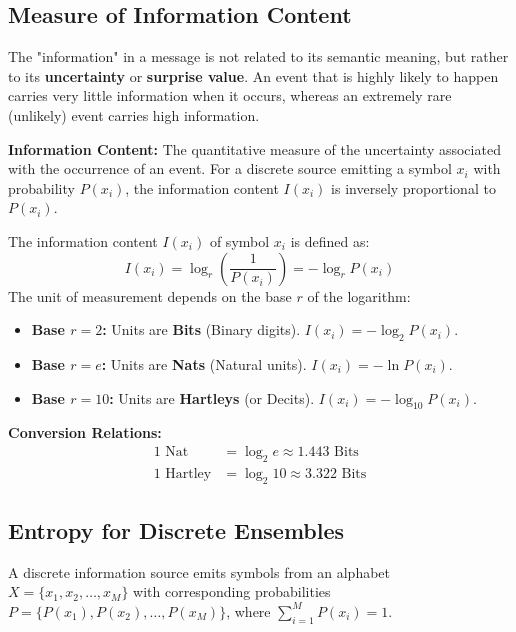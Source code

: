 \documentclass[12pt,a4paper]{article}
\begin{document}
\subsection{Measure of Information Content}
The "information" in a message is not related to its semantic meaning, but rather to its \textbf{uncertainty} or \textbf{surprise value}. An event that is highly likely to happen carries very little information when it occurs, whereas an extremely rare (unlikely) event carries high information.

\begin{tcolorbox}[defbox]
\textbf{Information Content:} The quantitative measure of the uncertainty associated with the occurrence of an event. For a discrete source emitting a symbol $x_i$ with probability $P(x_i)$, the information content $I(x_i)$ is inversely proportional to $P(x_i)$.
\end{tcolorbox}

\begin{tcolorbox}[formulabox, title={\textbf{Information Measurement Formula}}]
The information content $I(x_i)$ of symbol $x_i$ is defined as:
\begin{equation}
  I(x_i) = \log_r \left( \frac{1}{P(x_i)} \right) = -\log_r P(x_i)
\end{equation}
The unit of measurement depends on the base $r$ of the logarithm:
\begin{itemize}[leftmargin=1.5em, itemsep=2pt, topsep=2pt]
  \item[] \textbf{Base $r = 2$:} Units are \textbf{Bits} (Binary digits). $I(x_i) = -\log_2 P(x_i)$.
  \item[] \textbf{Base $r = e$:} Units are \textbf{Nats} (Natural units). $I(x_i) = -\ln P(x_i)$.
  \item[] \textbf{Base $r = 10$:} Units are \textbf{Hartleys} (or Decits). $I(x_i) = -\log_{10} P(x_i)$.
\end{itemize}
\textbf{Conversion Relations:}
\begin{align}
  1 \text{ Nat} &= \log_2 e \approx 1.443 \text{ Bits} \\
  1 \text{ Hartley} &= \log_2 10 \approx 3.322 \text{ Bits}
\end{align}
\end{tcolorbox}

\subsection{Entropy for Discrete Ensembles}
A discrete information source emits symbols from an alphabet $X = \{x_1, x_2, \dots, x_M\}$ with corresponding probabilities $P = \{P(x_1), P(x_2), \dots, P(x_M)\}$, where $\sum_{i=1}^M P(x_i) = 1$.
\end{document}
